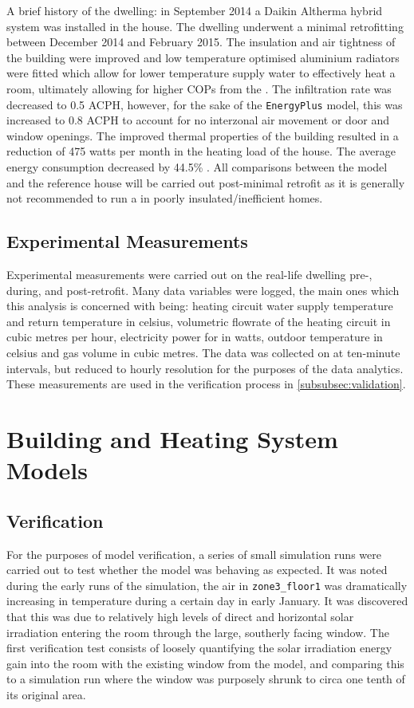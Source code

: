 A brief history of the dwelling: in September 2014 a Daikin Altherma hybrid \HP system was installed in the house. The dwelling underwent a minimal retrofitting between December 2014 and February 2015. The insulation and air tightness of the building were improved and low temperature optimised aluminium radiators were fitted which allow for lower temperature supply water to effectively heat a room, ultimately allowing for higher \acp{COP} from the \HP. The infiltration rate was decreased to 0.5 \ac{ACPH}, however, for the sake of the \texttt{EnergyPlus} model, this was increased to 0.8 \ac{ACPH} to account for no interzonal air movement or door and window openings. The improved thermal properties of the building resulted in a reduction of 475 watts per month in the heating load of the house. The average energy consumption decreased by 44.5\% \cite{keogh_technical_2018}. All comparisons between the model and the reference house will be carried out post-minimal retrofit as it is generally not recommended to run a \HP in poorly insulated/inefficient homes.

\subsection{Experimental Measurements} \label{subsec:expmeasure}
Experimental measurements were carried out on the real-life dwelling pre-, during, and post-retrofit. Many data variables were logged, the main ones which this analysis is concerned with being: heating circuit water supply temperature and return temperature in celsius, volumetric flowrate of the heating circuit in cubic metres per hour, electricity power for \HP in watts, outdoor temperature in celsius and gas volume in cubic metres. The data was collected on at ten-minute intervals, but reduced to hourly resolution for the purposes of the data analytics. These measurements are used in the verification process in \cref{subsubsec:validation}.


\section{Building and Heating System Models}\label{sec:methodheatingsys}



\subsection{Verification} \label{subsubsec:verification}
For the purposes of model verification, a series of small simulation runs were carried out to test whether the model was behaving as expected. It was noted during the early runs of the simulation, the air in \texttt{zone3\_floor1} was dramatically increasing in temperature during a certain day in early January. It was discovered that this was due to relatively high levels of direct and horizontal solar irradiation entering the room through the large, southerly facing window. The first verification test consists of loosely quantifying the solar irradiation energy gain into the room with the existing window from the model, and comparing this to a simulation run where the window was purposely shrunk to circa one tenth of its original area. 

